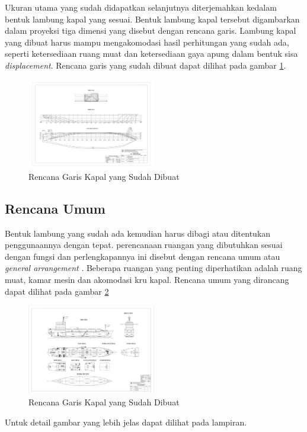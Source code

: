 Ukuran utama yang sudah didapatkan selanjutnya diterjemahkan kedalam bentuk lambung kapal yang sesuai. Bentuk lambung kapal tersebut digambarkan dalam proyeksi tiga dimensi yang disebut dengan rencana garis. Lambung kapal yang dibuat harus mampu mengakomodasi hasil perhitungan yang sudah ada, seperti ketersediaan ruang muat dan ketersediaan gaya apung dalam bentuk sisa \emph{displacement}. Rencana garis yang sudah dibuat dapat dilihat pada gambar \ref{fig:lines-plan}.

\begin{figure}[htbp!]
    \centering
    \includegraphics[width=0.5\textwidth]{gambar/Lines Plan 22 Ujil 03 48_page-0001(1).jpg}
    \caption{Rencana Garis Kapal yang Sudah Dibuat}
    \label{fig:lines-plan}
\end{figure}


\subsection{Rencana Umum}
\label{subsec:general-arrangement}

Bentuk lambung yang sudah ada kemudian harus dibagi atau ditentukan penggunaannya dengan tepat. perencanaan ruangan yang dibutuhkan sesuai dengan fungsi dan perlengkapannya ini disebut dengan rencana umum atau \emph{general arrangement} \citep{Taggart_1980}. Beberapa ruangan yang penting diperhatikan adalah ruang muat, kamar mesin dan akomodasi kru kapal. Rencana umum yang dirancang dapat dilihat pada gambar \ref{fig:general-arrangement}

\begin{figure}[htbp!]
    \centering
    \includegraphics[width=0.5\textwidth]{gambar/GA 22 Juli 03 45_page-0001(1).jpg}
    \caption{Rencana Garis Kapal yang Sudah Dibuat}
    \label{fig:general-arrangement}
\end{figure}

Untuk detail gambar yang lebih jelas dapat dilihat pada lampiran.
